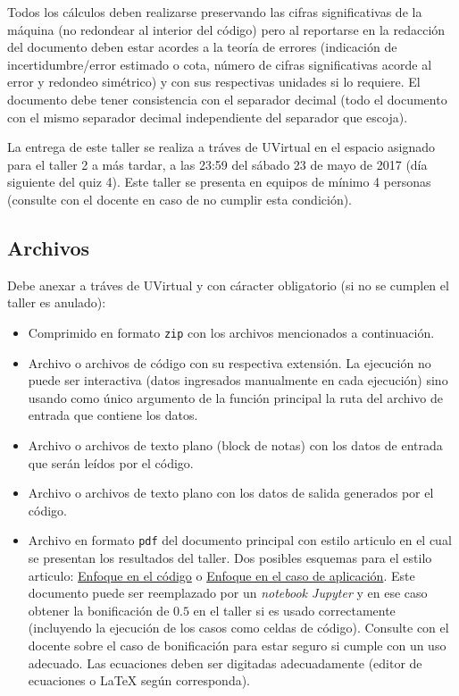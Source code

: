 \documentclass[12pt]{article}
\begin{document}
Todos los cálculos deben realizarse preservando las cifras significativas de la máquina (no redondear al interior del código) pero al reportarse en la redacción del documento deben estar acordes a la teoría de errores (indicación de incertidumbre/error estimado o cota, número de cifras significativas acorde al error y redondeo simétrico) y con sus respectivas unidades si lo requiere. El documento debe tener consistencia con el separador decimal (todo el documento con el mismo separador decimal independiente del separador que escoja).

La entrega de este taller se realiza a tráves de UVirtual en el espacio asignado para el taller 2 a más tardar, a las 23:59 del sábado 23 de mayo de 2017 (día siguiente del quiz 4). Este taller se presenta en equipos de mínimo 4 personas (consulte con el docente en caso de no cumplir esta condición).

\subsection{Archivos}

Debe anexar a tráves de UVirtual y con cáracter obligatorio (si no se cumplen el taller es anulado):

\begin{itemize}
\item Comprimido en formato \verb-zip- con los archivos mencionados a continuación.
\item Archivo o archivos de código con su respectiva extensión. La ejecución no puede ser interactiva (datos ingresados manualmente en cada ejecución) sino usando como único argumento de la función principal la ruta del archivo de entrada que contiene los datos.
\item Archivo o archivos de texto plano (block de notas) con los datos de entrada que serán leídos por el código.
\item Archivo o archivos de texto plano con los datos de salida generados por el código.
\item Archivo en formato \verb-pdf- del documento principal con estilo articulo en el cual se presentan los resultados del taller. Dos posibles esquemas para el estilo articulo: \href{http://www.sciencedirect.com/science/article/pii/S0010465516301254}{Enfoque en el código} o \href{https://arxiv.org/pdf/1205.3445.pdf}{Enfoque en el caso de aplicación}. Este documento puede ser reemplazado por un \textit{notebook Jupyter} y en ese caso obtener la bonificación de \(0.5\) en el taller si es usado correctamente (incluyendo la ejecución de los casos como celdas de código). Consulte con el docente sobre el caso de bonificación para estar seguro si cumple con un uso adecuado. Las ecuaciones deben ser digitadas adecuadamente (editor de ecuaciones o LaTeX según corresponda).
\end{itemize}
\end{document}
